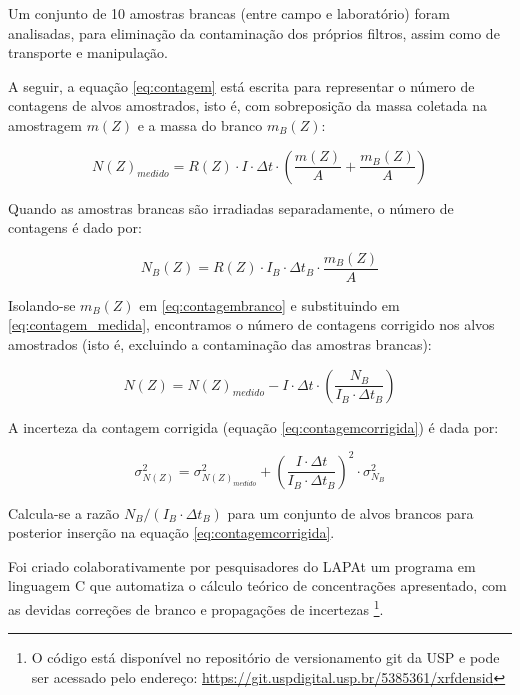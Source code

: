 Um conjunto de 10 amostras brancas (entre campo e laboratório) foram analisadas, 
para eliminação da contaminação dos próprios filtros, assim como de 
transporte e manipulação.

A seguir, a equação \ref{eq:contagem} está escrita para representar o número de contagens de alvos amostrados, isto é, com sobreposição da massa coletada na amostragem $m(Z)$ e a massa do branco $m_B(Z)$: 

\begin{equation}
  \label{eq:contagem_medida}
  N(Z)_{medido} = R(Z) \cdot I \cdot \Delta t \cdot \left( \frac{m(Z)}{A} + \frac{m_B(Z)}{A} \right)
\end{equation}  

Quando as amostras brancas são irradiadas separadamente, o número de contagens é dado por:

\begin{equation}
  \label{eq:contagembranco}
  N_B(Z) = R(Z) \cdot I_B \cdot \Delta t_B \cdot \frac{m_B(Z)}{A}
\end{equation}

Isolando-se $m_B(Z)$ em \ref{eq:contagembranco} e substituindo em 
\ref{eq:contagem_medida}, encontramos o número de contagens corrigido nos alvos amostrados
(isto é, excluindo a contaminação das amostras brancas):
 
\begin{equation}
  \label{eq:contagemcorrigida}
  N(Z) = N(Z)_{medido} - I \cdot \Delta t \cdot \left( \frac{N_B}{I_B \cdot \Delta t_B}  \right)
\end{equation}

A incerteza da contagem corrigida (equação \ref{eq:contagemcorrigida}) é dada por:

\begin{equation}
  \label{eq:erro_contagemcorrigida}
  \sigma_{N(Z)}^2 = \sigma_{N(Z)_{medido}}^2 + \left( \frac{I \cdot \Delta t}{I_B \cdot \Delta t_B} \right)^2 \cdot \sigma_{N_B}^2
\end{equation}

Calcula-se a razão $N_B/(I_B \cdot \Delta t_B)$ para um conjunto de alvos brancos para 
posterior inserção na equação \ref{eq:contagemcorrigida}.

Foi criado colaborativamente por pesquisadores do LAPAt um programa 
em linguagem C que automatiza o cálculo teórico de concentrações apresentado, 
com as devidas correções de branco e propagações de incertezas \footnote{
O código está disponível no repositório de versionamento git da USP 
e pode ser acessado pelo endereço: 
\url{https://git.uspdigital.usp.br/5385361/xrfdensid}}.


